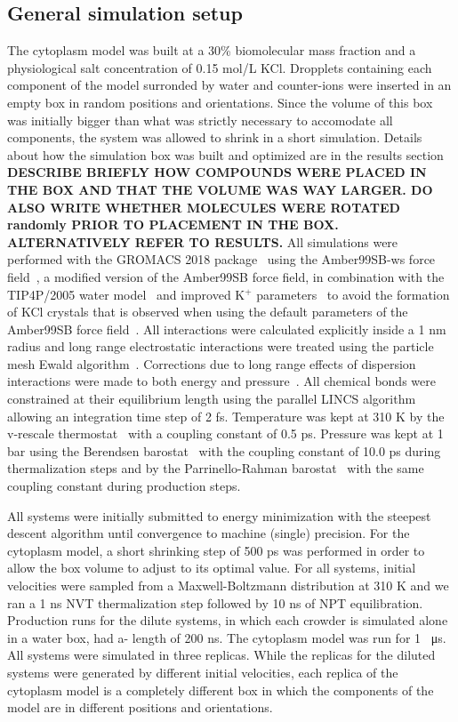 \documentclass[journal=jcisd8,manuscript=article]{achemso}
\begin{document}
 
 
\subsection{General simulation setup}
The cytoplasm model was built at a 30\% biomolecular mass fraction and
a physiological salt concentration of 0.15 mol/L KCl. {\color{blue} Dropplets containing each component of the model surronded by water and counter-ions were inserted in an empty box in random positions and orientations. Since the volume of this box was initially bigger than what was strictly necessary to accomodate all components, the system was allowed to shrink in a short simulation. Details about how the simulation box was built and optimized are in the results section} {\bf DESCRIBE
  BRIEFLY HOW COMPOUNDS WERE PLACED IN THE BOX AND THAT THE VOLUME WAS
  WAY LARGER. DO ALSO WRITE WHETHER MOLECULES WERE ROTATED randomly
  PRIOR TO PLACEMENT IN THE BOX. ALTERNATIVELY REFER TO RESULTS.}  All
simulations were performed with the GROMACS 2018
package~\cite{Abraham2015a,Pronk2013a} using the Amber99SB-ws force
field~\cite{Best2014a}, a modified version of the Amber99SB force
field, in combination with the TIP4P/2005 water
model~\cite{Abascal2005b} {\color{blue} and improved K$^+$ parameters~\cite{Dang1995a} to avoid the formation of KCl crystals that is observed when using the default parameters of the Amber99SB force field~\cite{Auffinger2007a}}. All interactions were calculated explicitly
inside a 1 nm radius and long range electrostatic interactions were
treated using the particle mesh Ewald
algorithm~\cite{Essmann1995a}. Corrections due to long range effects
of dispersion interactions were made to both energy and
pressure~\cite{Allen1987a}. All chemical bonds were constrained at
their equilibrium length using the parallel LINCS
algorithm~\cite{Hess1997a,Hess2008b} allowing an integration time step
of 2 fs. Temperature was kept at 310 K by the v-rescale
thermostat~\cite{Bussi2007a} with a coupling constant of 0.5
ps. Pressure was kept at 1 bar using the Berendsen
barostat~\cite{Berendsen1984a} with the coupling constant of 10.0 ps
during thermalization steps and by the Parrinello-Rahman
barostat~\cite{Parrinello1981a} with the same coupling constant during
production steps.

All systems were initially submitted to energy minimization with the
steepest descent algorithm until convergence to machine (single)
precision. For the cytoplasm model, a short shrinking step of 500 ps
was performed in order to allow the box volume to adjust to its
optimal value. For all systems, initial velocities were sampled from a
Maxwell-Boltzmann distribution at 310 K and we ran a 1 ns NVT
thermalization step followed by 10 ns of NPT equilibration. Production
runs for the dilute systems, in which each crowder is simulated alone
in a water box, had a- length of 200 ns. The cytoplasm model was run
for 1 \SI{}{\micro\second}. All systems were simulated in three
replicas. While the replicas for the diluted systems were generated by
different initial velocities, each replica of the cytoplasm model is a
completely different box in which the components of the model are in
different positions and orientations.
\end{document}
